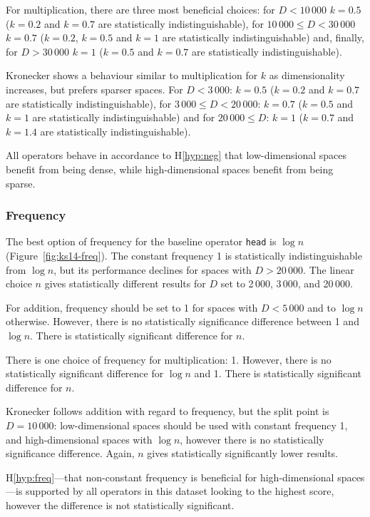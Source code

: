 For multiplication, there are three most beneficial choices: for $D < 10\,000$ $k = 0.5$ ($k=0.2$ and $k=0.7$ are statistically indistinguishable), for $10\,000 \leq D < 30\,000$ $k = 0.7$ ($k=0.2$, $k=0.5$ and $k=1$ are statistically indistinguishable) and, finally, for $D > 30\,000$ $k = 1$ ($k=0.5$ and $k=0.7$ are statistically indistinguishable).

Kronecker shows a behaviour  similar to multiplication for $k$ as dimensionality increases, but prefers sparser spaces. For $D < 3\,000$: $k = 0.5$ ($k=0.2$ and $k=0.7$ are statistically indistinguishable), for $3\,000 \leq D < 20\,000$: $k = 0.7$ ($k=0.5$ and $k=1$ are statistically indistinguishable) and for $20\,000 \leq D$: $k = 1$ ($k=0.7$ and $k=1.4$ are statistically indistinguishable).

All operators behave in accordance to H\ref{hyp:neg} that low-dimensional spaces benefit from being dense, while high-dimensional spaces benefit from being sparse.



\subsubsection{Frequency}
The best option of frequency for the baseline operator \texttt{head} is $\log n$ (Figure~\ref{fig:ks14-freq}). The constant frequency 1 is statistically indistinguishable from $\log n$, but its performance declines for spaces with $D > 20\,000$. The linear choice $n$ gives statistically different results for $D$ set to 2\,000, 3\,000, and 20\,000.

For addition, frequency should be set to 1 for spaces with $D < 5\,000$ and to $\log n$ otherwise. However, there is no statistically significance difference between 1 and $\log n$. There is statistically significant difference for $n$.

There is one choice of frequency for multiplication: 1. However, there is no statistically significant difference for $\log n$ and 1. There is statistically significant difference for $n$.

Kronecker follows addition with regard to frequency, but the split point is $D = 10\,000$: low-dimensional spaces should be used with constant frequency 1, and high-dimensional spaces with $\log n$, however there is no statistically significance difference. Again, $n$ gives statistically significantly lower results.

H\ref{hyp:freq}---that non-constant frequency is beneficial for high-dimensional spaces---is supported by all operators in this dataset looking to the highest score, however the difference is not statistically significant.

